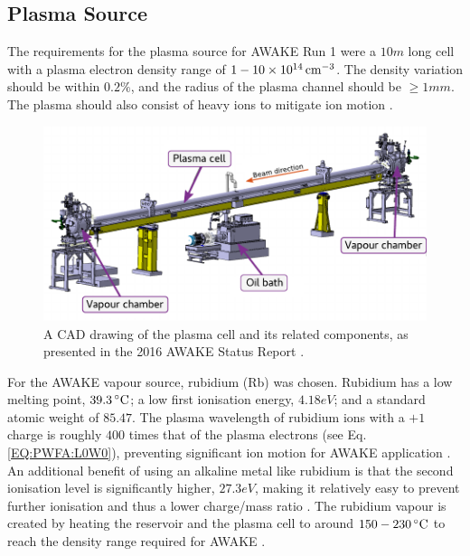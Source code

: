 \subsection{Plasma Source}
\label{WFA:Design:Plasma}

The requirements for the plasma source for AWAKE Run 1 were a $10\unit{m}$ long cell with a plasma electron density range of $1-10\nexp{14}\unit{cm}^{-3}$. The density variation should be within $0.2\%$, and the radius of the plasma channel should be $\geq 1\unit{mm}$. The plasma should also consist of heavy ions to mitigate ion motion \cite{caldwell:2015}.

\begin{figure}[hbt]
    \centering
    \includegraphics[width=0.99\linewidth,trim={0mm 0mm 0mm 0mm},clip]{figures/PlasmaCell}
    \caption{\label{Fig:WFA:PlasmaCell} A CAD drawing of the plasma cell and its related components, as presented in the 2016 AWAKE Status Report \cite{awake_collaboration:2016}.}
\end{figure}

For the AWAKE vapour source, rubidium (Rb) was chosen. Rubidium has a low melting point, $39.3\celsius$; a low first ionisation energy, $4.18\unit{eV}$; and a standard atomic weight of $85.47$. The plasma wavelength of rubidium ions with a $+1$ charge is roughly $400$ times that of the plasma electrons (see Eq. \ref{EQ:PWFA:L0W0}), preventing significant ion motion for AWAKE application \cite{vieira:2012a}. An additional benefit of using an alkaline metal like rubidium is that the second ionisation level is significantly higher, $27.3\unit{eV}$, making it relatively easy to prevent further ionisation and thus a lower charge/mass ratio \cite{awake_collaboration:2017}. The rubidium vapour is created by heating the reservoir and the plasma cell to around $150-230\celsius$ to reach the density range required for AWAKE \cite{caldwell:2015,muggli:2018}.


